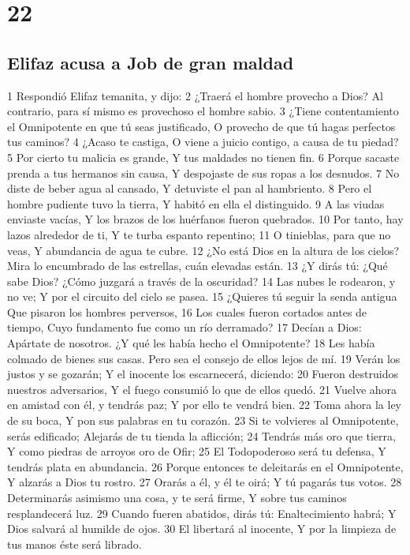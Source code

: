 \chapter{22}

\section*{Elifaz acusa a Job de gran maldad}

1 Respondió Elifaz temanita, y dijo:
2 ¿Traerá el hombre provecho a Dios?
Al contrario, para sí mismo es provechoso el hombre sabio.
3 ¿Tiene contentamiento el Omnipotente en que tú seas justificado,
O provecho de que tú hagas perfectos tus caminos? 
4 ¿Acaso te castiga,
O viene a juicio contigo, a causa de tu piedad?
5 Por cierto tu malicia es grande,
Y tus maldades no tienen fin.
6 Porque sacaste prenda a tus hermanos sin causa,
Y despojaste de sus ropas a los desnudos.
7 No diste de beber agua al cansado,
Y detuviste el pan al hambriento.
8 Pero el hombre pudiente tuvo la tierra,
Y habitó en ella el distinguido.
9 A las viudas enviaste vacías,
Y los brazos de los huérfanos fueron quebrados.
10 Por tanto, hay lazos alrededor de ti,
Y te turba espanto repentino;
11 O tinieblas, para que no veas,
Y abundancia de agua te cubre.
12 ¿No está Dios en la altura de los cielos?
Mira lo encumbrado de las estrellas, cuán elevadas están.
13 ¿Y dirás tú: ¿Qué sabe Dios?
¿Cómo juzgará a través de la oscuridad?
14 Las nubes le rodearon, y no ve;
Y por el circuito del cielo se pasea.
15 ¿Quieres tú seguir la senda antigua
Que pisaron los hombres perversos,
16 Los cuales fueron cortados antes de tiempo,
Cuyo fundamento fue como un río derramado?
17 Decían a Dios: Apártate de nosotros.
¿Y qué les había hecho el Omnipotente?
18 Les había colmado de bienes sus casas.
Pero sea el consejo de ellos lejos de mí.
19 Verán los justos y se gozarán;
Y el inocente los escarnecerá, diciendo:
20 Fueron destruidos nuestros adversarios,
Y el fuego consumió lo que de ellos quedó.
21 Vuelve ahora en amistad con él, y tendrás paz;
Y por ello te vendrá bien.
22 Toma ahora la ley de su boca,
Y pon sus palabras en tu corazón.
23 Si te volvieres al Omnipotente, serás edificado;
Alejarás de tu tienda la aflicción;
24 Tendrás más oro que tierra,
Y como piedras de arroyos oro de Ofir;
25 El Todopoderoso será tu defensa,
Y tendrás plata en abundancia.
26 Porque entonces te deleitarás en el Omnipotente,
Y alzarás a Dios tu rostro.
27 Orarás a él, y él te oirá;
Y tú pagarás tus votos.
28 Determinarás asimismo una cosa, y te será firme,
Y sobre tus caminos resplandecerá luz.
29 Cuando fueren abatidos, dirás tú: Enaltecimiento habrá;
Y Dios salvará al humilde de ojos.
30 El libertará al inocente,
Y por la limpieza de tus manos éste será librado.

